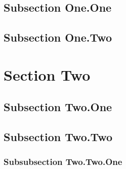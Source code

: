 \documentclass[11pt]{article}
\begin{document}
    \subsection{Subsection One.One}
    \subsection{Subsection One.Two}
\section{Section Two}
    \subsection{Subsection Two.One}
    \subsection{Subsection Two.Two}
        \subsubsection{Subsubsection Two.Two.One}

        
\end{document}
